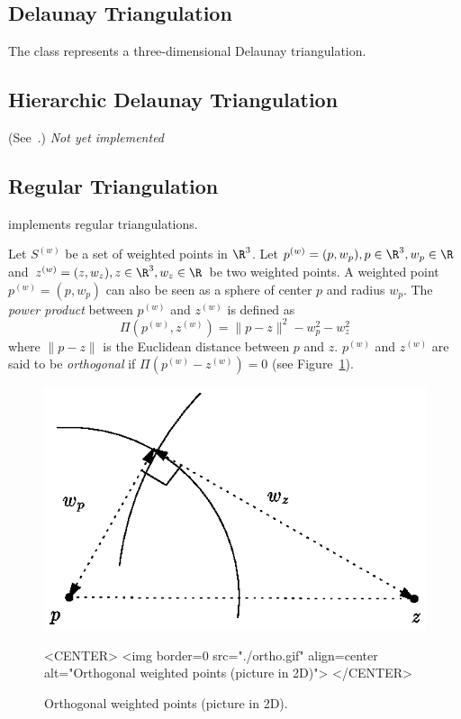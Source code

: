 \subsection{Delaunay Triangulation} 

The class 
represents a three-dimensional Delaunay triangulation. 

\subsection{Hierarchic Delaunay Triangulation} 
(See~\cite{d-iirdt-98}.)
\textit{Not yet implemented}

\subsection{Regular Triangulation} 
\label{Triangulation3-sec-class-Regulartriangulation}

 implements
regular triangulations.

Let ${S}^{(w)}$ be a set of weighted points in $\R^3$. Let
${p}^{(w)}=(p,w_p), p\in\R^3, w_p\in\R$ and 
${z}^{(w)}=(z,w_z), z\in\R^3, w_z\in\R$ be two weighted points. 
A weighted point
${p}^{(w)}=(p,w_p)$ can also be seen as a sphere of center $p$ and
radius $w_p$. 
The \textit{power product} between ${p}^{(w)}$ and ${z}^{(w)}$ is
defined as 
\[\Pi({p}^{(w)},{z}^{(w)}) = {\|{p-z}\|^2-w_p^2-w_z^2}\]
where $\|{p-z}\|$ is the Euclidean distance between $p$ and $z$. 
 ${p}^{(w)}$ and ${z}^{(w)}$
are said to be \textit{orthogonal} if $\Pi{({p}^{(w)}-{z}^{(w)})}
= 0$ (see Figure~\ref{Triangulation3-fig-ortho}).

\begin{figure}[htbp]
\begin{ccTexOnly}
\begin{center} 
\includegraphics{ortho.eps} 
\end{center}
\end{ccTexOnly}
\caption{Orthogonal weighted points (picture in 2D).
\label{Triangulation3-fig-ortho}}
\begin{ccHtmlOnly}
<CENTER>
<img border=0 src="./ortho.gif" align=center alt="Orthogonal weighted
points (picture in 2D)"> 
</CENTER>
\end{ccHtmlOnly}
\end{figure} 

